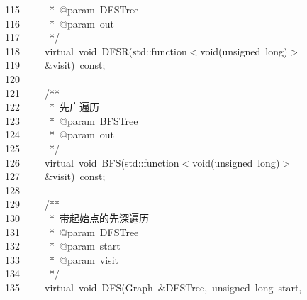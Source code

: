 \documentclass{ctexart}
\newcommand{\hlstd}[1]{\textcolor[rgb]{0.2,0.2,0.2}{#1}}
\newcommand{\hlcom}[1]{\textcolor[rgb]{0.59,0.59,0.59}{#1}}
\newcommand{\hlopt}[1]{\textcolor[rgb]{0.2,0.2,0.2}{#1}}
\newcommand{\hllin}[1]{\textcolor[rgb]{0.59,0.59,0.59}{#1}}
\newcommand{\hlkwb}[1]{\textcolor[rgb]{0.63,0,0.31}{#1}}
\newcommand{\hlkwc}[1]{\textcolor[rgb]{0,0.63,0.31}{#1}}
\newcommand{\hlkwd}[1]{\textcolor[rgb]{0.78,0.23,0.41}{#1}}
\begin{document}
\hllin{115\ }\hlcom{}\hlstd{\ \ \ \ \ }\hlcom{{*}\ @param\ DFSTree}\\
\hllin{116\ }\hlcom{}\hlstd{\ \ \ \ \ }\hlcom{{*}\ @param\ out}\\
\hllin{117\ }\hlcom{}\hlstd{\ \ \ \ \ }\hlcom{{*}/}\hlstd{}\\
\hllin{118\ }\hlstd{}\hlstd{\ \ \ \ }\hlstd{}\hlkwc{virtual\ }\hlstd{}\hlkwb{void\ }\hlstd{}\hlkwd{DFSR}\hlstd{}\hlopt{(}\hlstd{}\hlkwc{std}\hlstd{}\hlopt{::}\hlstd{function}\hlopt{$<$}\hlstd{}\hlkwb{void}\hlstd{}\hlopt{(}\hlstd{}\hlkwb{unsigned\ long}\hlstd{}\hlopt{)$>$\ }\Righttorque\\
\hllin{119\ }\hlstd{}\hlstd{\ \ \ \ }\hlstd{}\hlopt{\&}\hlstd{visit}\hlopt{)\ }\hlstd{}\hlkwb{const}\hlstd{}\hlopt{;}\\
\hllin{120\ }\hlstd{}\\
\hllin{121\ }\hlstd{}\hlstd{\ \ \ \ }\hlstd{}\hlcom{/{*}{*}}\\
\hllin{122\ }\hlcom{}\hlstd{\ \ \ \ \ }\hlcom{{*}\ 先广遍历}\\
\hllin{123\ }\hlcom{}\hlstd{\ \ \ \ \ }\hlcom{{*}\ @param\ BFSTree}\\
\hllin{124\ }\hlcom{}\hlstd{\ \ \ \ \ }\hlcom{{*}\ @param\ out}\\
\hllin{125\ }\hlcom{}\hlstd{\ \ \ \ \ }\hlcom{{*}/}\hlstd{}\\
\hllin{126\ }\hlstd{}\hlstd{\ \ \ \ }\hlstd{}\hlkwc{virtual\ }\hlstd{}\hlkwb{void\ }\hlstd{}\hlkwd{BFS}\hlstd{}\hlopt{(}\hlstd{}\hlkwc{std}\hlstd{}\hlopt{::}\hlstd{function}\hlopt{$<$}\hlstd{}\hlkwb{void}\hlstd{}\hlopt{(}\hlstd{}\hlkwb{unsigned\ long}\hlstd{}\hlopt{)$>$\ }\Righttorque\\
\hllin{127\ }\hlstd{}\hlstd{\ \ \ \ }\hlstd{}\hlopt{\&}\hlstd{visit}\hlopt{)\ }\hlstd{}\hlkwb{const}\hlstd{}\hlopt{;}\\
\hllin{128\ }\hlstd{}\\
\hllin{129\ }\hlstd{}\hlstd{\ \ \ \ }\hlstd{}\hlcom{/{*}{*}}\\
\hllin{130\ }\hlcom{}\hlstd{\ \ \ \ \ }\hlcom{{*}\ 带起始点的先深遍历}\\
\hllin{131\ }\hlcom{}\hlstd{\ \ \ \ \ }\hlcom{{*}\ @param\ DFSTree}\\
\hllin{132\ }\hlcom{}\hlstd{\ \ \ \ \ }\hlcom{{*}\ @param\ start}\\
\hllin{133\ }\hlcom{}\hlstd{\ \ \ \ \ }\hlcom{{*}\ @param\ visit}\\
\hllin{134\ }\hlcom{}\hlstd{\ \ \ \ \ }\hlcom{{*}/}\hlstd{}\\
\hllin{135\ }\hlstd{}\hlstd{\ \ \ \ }\hlstd{}\hlkwc{virtual\ }\hlstd{}\hlkwb{void\ }\hlstd{}\hlkwd{DFS}\hlstd{}\hlopt{(}\hlstd{Graph\ }\hlopt{\&}\hlstd{DFSTree}\hlopt{,\ }\hlstd{}\hlkwb{unsigned\ long\ }\hlstd{start}\hlopt{,\ }\Righttorque\\
\end{document}
